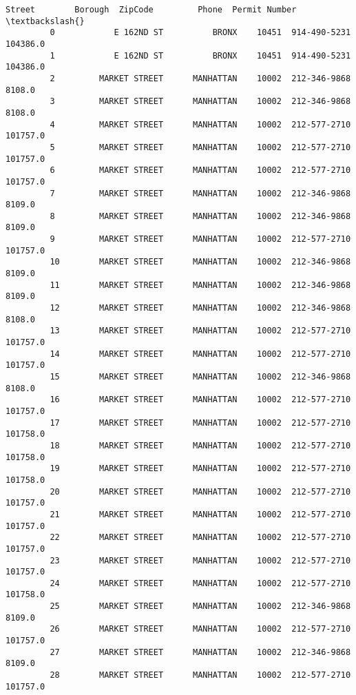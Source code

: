 \documentclass[11pt]{article}
\begin{document}
\begin{Verbatim}[commandchars=\\\{\}]
                          Street        Borough  ZipCode         Phone  Permit Number  \textbackslash{}
         0            E 162ND ST          BRONX    10451  914-490-5231       104386.0   
         1            E 162ND ST          BRONX    10451  914-490-5231       104386.0   
         2         MARKET STREET      MANHATTAN    10002  212-346-9868         8108.0   
         3         MARKET STREET      MANHATTAN    10002  212-346-9868         8108.0   
         4         MARKET STREET      MANHATTAN    10002  212-577-2710       101757.0   
         5         MARKET STREET      MANHATTAN    10002  212-577-2710       101757.0   
         6         MARKET STREET      MANHATTAN    10002  212-577-2710       101757.0   
         7         MARKET STREET      MANHATTAN    10002  212-346-9868         8109.0   
         8         MARKET STREET      MANHATTAN    10002  212-346-9868         8109.0   
         9         MARKET STREET      MANHATTAN    10002  212-577-2710       101757.0   
         10        MARKET STREET      MANHATTAN    10002  212-346-9868         8109.0   
         11        MARKET STREET      MANHATTAN    10002  212-346-9868         8109.0   
         12        MARKET STREET      MANHATTAN    10002  212-346-9868         8108.0   
         13        MARKET STREET      MANHATTAN    10002  212-577-2710       101757.0   
         14        MARKET STREET      MANHATTAN    10002  212-577-2710       101757.0   
         15        MARKET STREET      MANHATTAN    10002  212-346-9868         8108.0   
         16        MARKET STREET      MANHATTAN    10002  212-577-2710       101757.0   
         17        MARKET STREET      MANHATTAN    10002  212-577-2710       101758.0   
         18        MARKET STREET      MANHATTAN    10002  212-577-2710       101758.0   
         19        MARKET STREET      MANHATTAN    10002  212-577-2710       101758.0   
         20        MARKET STREET      MANHATTAN    10002  212-577-2710       101757.0   
         21        MARKET STREET      MANHATTAN    10002  212-577-2710       101757.0   
         22        MARKET STREET      MANHATTAN    10002  212-577-2710       101757.0   
         23        MARKET STREET      MANHATTAN    10002  212-577-2710       101757.0   
         24        MARKET STREET      MANHATTAN    10002  212-577-2710       101758.0   
         25        MARKET STREET      MANHATTAN    10002  212-346-9868         8109.0   
         26        MARKET STREET      MANHATTAN    10002  212-577-2710       101757.0   
         27        MARKET STREET      MANHATTAN    10002  212-346-9868         8109.0   
         28        MARKET STREET      MANHATTAN    10002  212-577-2710       101757.0   

\end{Verbatim}
\end{document}
